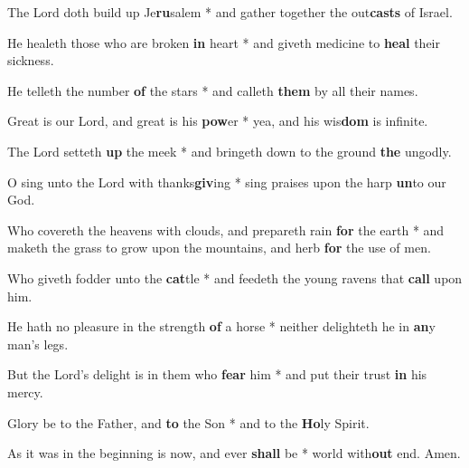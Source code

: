 \begin{multicols}{2}
	The Lord doth build up Je\textbf{ru}salem * and gather together the out\textbf{casts} of Israel.
	
	He healeth those who are broken \textbf{in} heart * and giveth medicine to \textbf{heal} their sickness.
	
	He telleth the number \textbf{of} the stars * and calleth \textbf{them} by all their names.
	
	Great is our Lord, and great is his \textbf{pow}er * yea, and his wis\textbf{dom} is infinite.
	
	The Lord setteth \textbf{up} the meek * and bringeth down to the ground \textbf{the} ungodly.
	
	O sing unto the Lord with thanks\textbf{giv}ing * sing praises upon the harp \textbf{un}to our God.
	
	Who covereth the heavens with clouds, and prepareth rain \textbf{for} the earth * and maketh the grass to grow upon the mountains, and herb \textbf{for} the use of men.
	
	Who giveth fodder unto the \textbf{cat}tle * and feedeth the young ravens that \textbf{call} upon him.
	
	He hath no pleasure in the strength \textbf{of} a horse * neither delighteth he in \textbf{an}y man's legs.
	
	But the Lord's delight is in them who \textbf{fear} him * and put their trust \textbf{in} his mercy.
	
	Glory be to the Father, and \textbf{to} the Son * and to the \textbf{Ho}ly Spirit.
	
	As it was in the beginning is now, and ever \textbf{shall} be * world with\textbf{out} end. Amen.
\end{multicols}